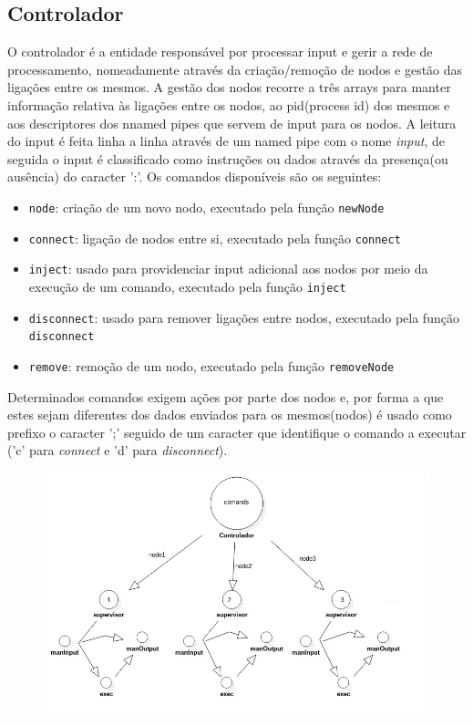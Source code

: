 \documentclass[12pt]{article}
\begin{document}
\subsection{Controlador}
O controlador é a entidade responsável por processar input e gerir a rede de processamento, nomeadamente através da criação/remoção de nodos e gestão das ligações entre os mesmos.
A gestão dos nodos recorre a três arrays para manter informação relativa às ligações entre os nodos, ao pid(process id) dos mesmos e aos descriptores dos nnamed pipes que servem de input para os nodos.
A leitura do input é feita linha a linha através de um named pipe com o nome \textit{input}, de seguida o input é classificado como instruções ou dados através da presença(ou ausência) do caracter ':'.
Os comandos disponíveis são os seguintes:
\begin{itemize}
\item \texttt{node}: criação de um novo nodo, executado pela função \texttt{newNode}
\item \texttt{connect}: ligação de nodos entre si, executado pela função \texttt{connect}
\item \texttt{inject}: usado para providenciar input adicional aos nodos por meio da execução de um comando, executado pela função \texttt{inject}
\item \texttt{disconnect}: usado para remover ligações entre nodos, executado pela função \texttt{disconnect}
\item \texttt{remove}: remoção de um nodo, executado pela função \texttt{removeNode}
\end{itemize}
Determinados comandos exigem ações por parte dos nodos e, por forma a que estes sejam diferentes dos dados enviados para os mesmos(nodos) é usado como prefixo o caracter ';' seguido de um caracter que identifique o comando a executar ('c' para \textit{connect} e 'd' para \textit{disconnect}).

\begin{figure}[ht!]
     \centering
         \includegraphics[width=120mm]{graph.jpg}
     \caption{}
\end{figure}
\end{document}
